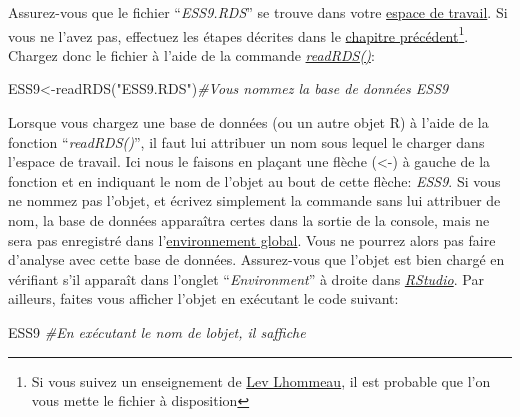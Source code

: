 \documentclass[
]{book}
\newenvironment{Shaded}{\begin{snugshade}}{\end{snugshade}}
\newcommand{\CommentTok}[1]{\textcolor[rgb]{0.56,0.35,0.01}{\textit{#1}}}
\newcommand{\FunctionTok}[1]{\textcolor[rgb]{0.00,0.00,0.00}{#1}}
\newcommand{\NormalTok}[1]{#1}
\newcommand{\OtherTok}[1]{\textcolor[rgb]{0.56,0.35,0.01}{#1}}
\newcommand{\StringTok}[1]{\textcolor[rgb]{0.31,0.60,0.02}{#1}}
\begin{document}
Assurez-vous que le fichier ``\emph{ESS9.RDS}'' se trouve dans votre \protect\hyperlink{working_directory}{espace de travail}. Si vous ne l'avez pas, effectuez les étapes décrites dans le \protect\hyperlink{import_donnees}{chapitre précédent}\footnote{Si vous suivez un enseignement de \href{mailto:lhommeau@gmail.com}{Lev Lhommeau}, il est probable que l'on vous mette le fichier à disposition}. Chargez donc le fichier à l'aide de la commande \href{https://www.rdocumentation.org/packages/base/versions/3.6.2/topics/readRDS}{\emph{readRDS()}}:

\begin{Shaded}
\begin{Highlighting}[]
\NormalTok{ESS9}\OtherTok{\textless{}{-}}\FunctionTok{readRDS}\NormalTok{(}\StringTok{"ESS9.RDS"}\NormalTok{)}\CommentTok{\#Vous nommez la base de données ESS9}
\end{Highlighting}
\end{Shaded}

Lorsque vous chargez une base de données (ou un autre objet R) à l'aide de la fonction ``\emph{readRDS()}'', il faut lui attribuer un nom sous lequel le charger dans l'espace de travail. Ici nous le faisons en plaçant une flèche (\textless-) à gauche de la fonction et en indiquant le nom de l'objet au bout de cette flèche: \emph{ESS9}. Si vous ne nommez pas l'objet, et écrivez simplement la commande sans lui attribuer de nom, la base de données apparaîtra certes dans la sortie de la console, mais ne sera pas enregistré dans l'\protect\hyperlink{objets_envir}{environnement global}. Vous ne pourrez alors pas faire d'analyse avec cette base de données. Assurez-vous que l'objet est bien chargé en vérifiant s'il apparaît dans l'onglet ``\emph{Environment}'' à droite dans \href{https://posit.co/}{\emph{RStudio}}. Par ailleurs, faites vous afficher l'objet en exécutant le code suivant:

\begin{Shaded}
\begin{Highlighting}[]
\NormalTok{ESS9 }\CommentTok{\#En exécutant le nom de l\textquotesingle{}objet, il s\textquotesingle{}affiche}
\end{Highlighting}
\end{Shaded}
\end{document}
